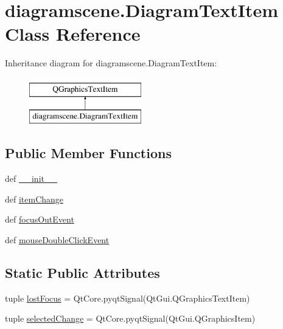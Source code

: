\hypertarget{classdiagramscene_1_1DiagramTextItem}{}\section{diagramscene.\+Diagram\+Text\+Item Class Reference}
\label{classdiagramscene_1_1DiagramTextItem}
Inheritance diagram for diagramscene.\+Diagram\+Text\+Item\+:\begin{figure}[H]
\begin{center}
\leavevmode
\includegraphics[height=2.000000cm]{classdiagramscene_1_1DiagramTextItem}
\end{center}
\end{figure}
\subsection*{Public Member Functions}
\begin{DoxyCompactItemize}
\item 
def \hyperlink{classdiagramscene_1_1DiagramTextItem_a16686aa9d864606342c473026e5fbb55}{\+\_\+\+\_\+init\+\_\+\+\_\+}
\item 
def \hyperlink{classdiagramscene_1_1DiagramTextItem_aca5b71477ff68f0278655c3c399f47d4}{item\+Change}
\item 
def \hyperlink{classdiagramscene_1_1DiagramTextItem_afa0499a48e23ee3f7caa7674376d9c78}{focus\+Out\+Event}
\item 
def \hyperlink{classdiagramscene_1_1DiagramTextItem_abf2ca250518f40909d71dd3f52a7d05c}{mouse\+Double\+Click\+Event}
\end{DoxyCompactItemize}
\subsection*{Static Public Attributes}
\begin{DoxyCompactItemize}
\item 
tuple \hyperlink{classdiagramscene_1_1DiagramTextItem_ade3304c68ba539562c08102cab5c1e5f}{lost\+Focus} = Qt\+Core.\+pyqt\+Signal(Qt\+Gui.\+Q\+Graphics\+Text\+Item)
\item 
tuple \hyperlink{classdiagramscene_1_1DiagramTextItem_af3589e91f36594adb07f449da7cb4144}{selected\+Change} = Qt\+Core.\+pyqt\+Signal(Qt\+Gui.\+Q\+Graphics\+Item)
\end{DoxyCompactItemize}


